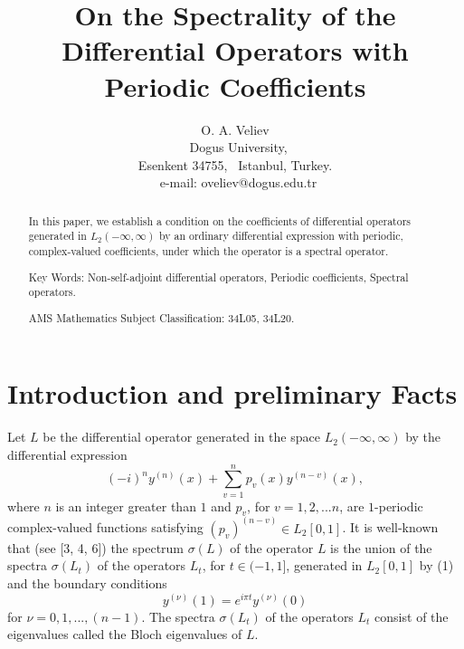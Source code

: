 \documentclass{article}%
\begin{document}
\title{On the Spectrality of the Differential Operators with Periodic Coefficients}
\author{O. A. Veliev\\{\small \ Dogus University, }\\{\small Esenkent 34755, \ Istanbul, Turkey.}\\\ {\small e-mail: oveliev@dogus.edu.tr}}
\date{}
\maketitle

\begin{abstract}
In this paper, we establish a condition on the coefficients of differential
operators generated in $L_{2}(-\infty,\infty)$ by an ordinary differential
expression with periodic, complex-valued coefficients, under which the
operator is a spectral operator.

Key Words: Non-self-adjoint differential operators, Periodic coefficients,
Spectral operators.

AMS Mathematics Subject Classification: 34L05, 34L20.

\end{abstract}

\section{\qquad Introduction and preliminary Facts}

Let $L$ be the differential operator generated in the space $L_{2}%
(-\infty,\infty)$ by the differential expression
\begin{equation}
(-i)^{n}y^{(n)}(x)+%
{\textstyle\sum\limits_{v=1}^{n}}
p_{v}(x)y^{(n-v)}(x), \tag{1}%
\end{equation}
where $n$ is an integer greater than $1$ and $p_{v}$, for $v=1,2,...n$, are
$1$-periodic complex-valued functions satisfying $\left(  p_{v}\right)
^{(n-v)}\in L_{2}\left[  0,1\right]  $. It is well-known that (see [3, 4, 6])
the spectrum $\sigma(L)$ of the operator $L$ is the union of the spectra
$\sigma(L_{t})$ of the operators $L_{t}$, for $t\in(-1,1]$, generated in
$L_{2}\left[  0,1\right]  $ by (1) and the boundary conditions
\begin{equation}
y^{(\mathbb{\nu})}\left(  1\right)  =e^{i\pi t}y^{(\mathbb{\nu})}\left(
0\right)  \tag{2}%
\end{equation}
for $\mathbb{\nu}=0,1,...,(n-1).$ The spectra $\sigma(L_{t})$ of the operators
$L_{t}$ consist of the eigenvalues called the Bloch eigenvalues of $L$.
\end{document}
